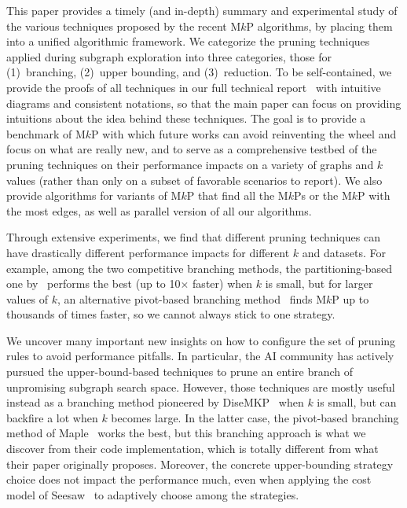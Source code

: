 \documentclass[sigconf, nonacm]{acmart}
\begin{document}
This paper provides a timely (and in-depth) summary and experimental study of the various techniques proposed by the recent M$k$P algorithms, by placing them into a unified algorithmic framework. We categorize the pruning techniques applied during subgraph exploration into three categories, those for (1)~branching, (2)~upper bounding, and (3)~reduction. To be self-contained, we provide the proofs of all techniques in our full technical report~\cite{tech_report} with intuitive diagrams and consistent notations, so that the main paper can focus on providing intuitions about the idea behind these techniques. The goal is to provide a benchmark of M$k$P with which future works can avoid reinventing the wheel and focus on what are really new, and to serve as a comprehensive testbed of the pruning techniques on their performance impacts on a variety of graphs and $k$ values (rather than only on a subset of favorable scenarios to report). We also provide algorithms for variants of M$k$P that find all the M$k$Ps or the M$k$P with the most edges, as well as parallel version of all our algorithms.

Through extensive experiments, we find that different pruning techniques can have drastically different performance impacts for different $k$ and datasets. For example, among the two competitive branching methods, the partitioning-based one by~\cite{DiseMKP} performs the best (up to 10$\times$ faster) when $k$ is small, but for larger values of $k$, an alternative pivot-based branching method~\cite{Maple}  finds M$k$P up to thousands of times faster, so we cannot always stick to one strategy. 

We uncover many important new insights on how to configure the set of pruning rules to avoid performance pitfalls. In particular, the AI community has actively pursued the upper-bound-based techniques to prune an entire branch of unpromising subgraph search space. However, those techniques are mostly useful instead as a branching method pioneered by DiseMKP~\cite{DiseMKP} when $k$ is small, but can backfire a lot when $k$ becomes large. In the latter case, the pivot-based branching method of Maple~\cite{Maple} works the best, but this branching approach is what we discover from their code implementation, which is totally different from what their paper originally proposes. Moreover, the concrete upper-bounding strategy choice does not impact the performance much, even when applying the cost model of Seesaw~\cite{seesaw} to adaptively choose among the strategies.
\end{document}
